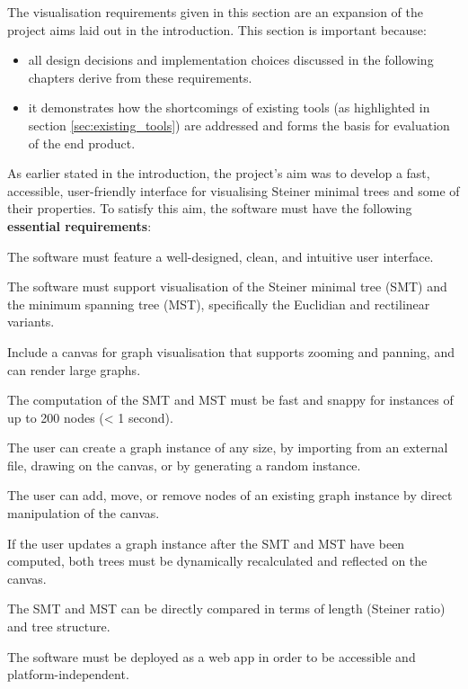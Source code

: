 \documentclass{l4proj}
\begin{document}
The visualisation requirements given in this section are an expansion of the project aims laid out in the introduction. This section is important because:
\begin{itemize}
    \item all design decisions and implementation choices discussed in the following chapters derive from these requirements.
    \item it demonstrates how the shortcomings of existing tools (as highlighted in section \ref{sec:existing_tools}) are addressed and forms the basis for evaluation of the end product.
\end{itemize}
As earlier stated in the introduction, the project's aim was to develop a fast, accessible, user-friendly interface for visualising Steiner minimal trees and some of their properties.
To satisfy this aim, the software must have the following \textbf{essential requirements}:
\begin{requirements}
    \item The software must feature a well-designed, clean, and intuitive user interface.
    \item The software must support visualisation of the Steiner minimal tree (SMT) and the minimum spanning tree (MST), specifically the Euclidian and rectilinear variants.
    \item Include a canvas for graph visualisation that supports zooming and panning, and can render large graphs.
    \item The computation of the SMT and MST must be fast and snappy for instances of up to 200 nodes (< 1 second).
    \item The user can create a graph instance of any size, by importing from an external file, drawing on the canvas, or by generating a random instance.
    \item The user can add, move, or remove nodes of an existing graph instance by direct manipulation of the canvas.
    \item If the user updates a graph instance after the SMT and MST have been computed, both trees must be dynamically recalculated and reflected on the canvas.
    \item The SMT and MST can be directly compared in terms of length (Steiner ratio) and tree structure.
    \item The software must be deployed as a web app in order to be accessible and platform-independent.

\end{requirements}
\end{document}
